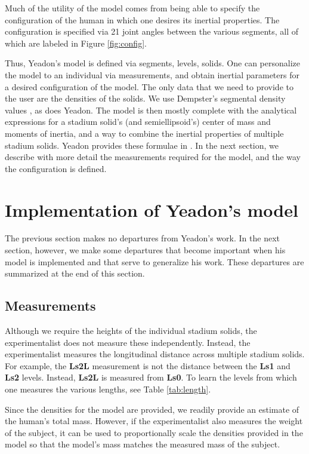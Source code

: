 \documentclass[10pt]{article}
\begin{document}
Much of the utility of the model comes from being able to specify the
configuration of the human in which one desires its inertial properties. The
configuration is specified via 21 joint angles between the various segments,
all of which are labeled in Figure \ref{fig:config}.

Thus, Yeadon's model is defined via segments, levels, solids. One can
personalize the model to an individual via measurements, and obtain inertial
parameters for a desired configuration of the model. The only data that we need
to provide to the user are the densities of the solids. We use Dempster's
segmental density values \cite{Dempster1955}, as does Yeadon. The model is then
mostly complete with the analytical expressions for a stadium solid's (and semiellipsoid's) center of
mass and moments of inertia, and a way to combine the inertial properties of
multiple stadium solids. Yeadon provides these formulae in \cite{Yeadon1990f}.
In the next section, we describe with more detail the measurements required for
the model, and the way the configuration is defined.

\section*{Implementation of Yeadon's model}

The previous section makes no departures from Yeadon's work. In the next
section, however, we make some departures that become important when his model
is implemented and that serve to generalize his work. These departures are
summarized at the end of this section.

\subsection*{Measurements}

Although we require the heights of the individual stadium solids, the
experimentalist does not measure these independently. Instead, the
experimentalist measures the longitudinal distance across multiple stadium
solids. For example, the \textbf{Ls2L} measurement is not the distance between
the \textbf{Ls1} and \textbf{Ls2} levels. Instead, \textbf{Ls2L} is measured
from \textbf{Ls0}. To learn the levels from which one measures the various
lengths, see Table \ref{tab:length}.


Since the densities for the model are provided, we readily provide an estimate
of the human's total mass. However, if the experimentalist also measures the
weight of the subject, it can be used to proportionally scale the densities
provided in the model so that the model's mass matches the measured mass of the
subject.
\end{document}
